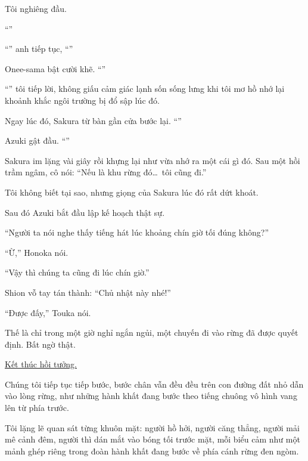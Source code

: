 \documentclass[../main.tex]{subfiles}
\begin{document}
Tôi nghiêng đầu.

``''

``'' anh tiếp tục, ``''

Onee-sama bật cười khẽ. ``''

``'' tôi tiếp lời, không giấu cảm giác lạnh sốn sống lưng khi tôi mơ hồ nhớ lại khoảnh khắc ngôi trường bị đổ sập lúc đó.

Ngay lúc đó, Sakura từ bàn gần cửa bước lại. ``''

Azuki gật đầu. ``''

Sakura im lặng vài giây rồi khựng lại như vừa nhớ ra một cái gì đó. Sau một hồi trầm ngâm, cô nói: ``Nếu là khu rừng đó\dots\ tôi cũng đi.''

Tôi không biết tại sao, nhưng giọng của Sakura lúc đó rất dứt khoát.

Sau đó Azuki bắt đầu lập kế hoạch thật sự.

``Người ta nói nghe thấy tiếng hát lúc khoảng chín giờ tối đúng không?''

``Ừ,'' Honoka nói.

``Vậy thì chúng ta cũng đi lúc chín giờ.''

Shion vỗ tay tán thành: ``Chủ nhật này nhé!''

``Được đấy,'' Touka nói.

Thế là chỉ trong một giờ nghỉ ngắn ngủi, một chuyến đi vào rừng đã được quyết định. Bất ngờ thật.

\begin{center}
  \uline{Kết thúc hồi tưởng.}
\end{center}

Chúng tôi tiếp tục tiếp bước, bước chân vẫn đều đều trên con đường đất nhỏ dẫn vào lòng rừng, như những hành khất đang bước theo tiếng chuông vô hình vang lên từ phía trước.

Tôi lặng lẽ quan sát từng khuôn mặt: người hồ hởi, người căng thẳng, người mải mê cảnh đêm, người thì dán mắt vào bóng tối trước mặt, mỗi biểu cảm như một mảnh ghép riêng trong đoàn hành khất đang bước về phía cánh rừng đen ngòm.
\end{document}
